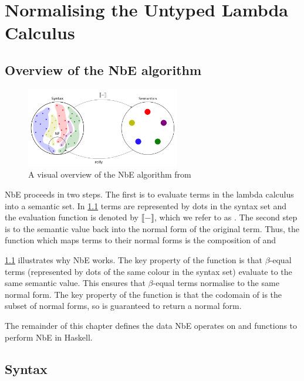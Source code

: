 \chapter{Normalising the Untyped Lambda Calculus}
\label{chap:untypednbe}

\section{Overview of the NbE algorithm}

\begin{figure}[h]
    \centering
    \includegraphics[width=0.6\textwidth]{./images/nbe_diagram}
    \caption{A visual overview of the NbE algorithm from \cite{slides}}
    \label{fig:nbeOverview}
\end{figure}

NbE proceeds in two steps. The first is to evaluate terms in the lambda calculus into a semantic set. In \ref{fig:nbeOverview} terms are represented by dots in the syntax set and the evaluation function is denoted by $\llbracket - \rrbracket$, which we refer to as . The second step is to  the semantic value back into the normal form of the original term. Thus, the  function which maps terms to their normal forms is the composition of  and 

\ref{fig:nbeOverview} illustrates why NbE works. The key property of the  function is that $\beta$-equal terms (represented by dots of the same colour in the syntax set) evaluate to the same semantic value. This ensures that $\beta$-equal terms normalise to the same normal form. The key property of the  function is that the codomain of  is the subset of normal forms, so  is guaranteed to return a normal form. 

The remainder of this chapter defines the data NbE operates on and functions to perform NbE in Haskell.

\section{Syntax}

